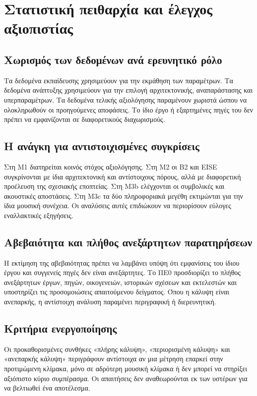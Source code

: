\documentclass[11pt,a4paper]{extarticle}
\begin{document}
\section{Στατιστική πειθαρχία και έλεγχος αξιοπιστίας}
\subsection*{Χωρισμός των δεδομένων ανά ερευνητικό ρόλο}
Τα δεδομένα εκπαίδευσης χρησιμεύουν για την εκμάθηση των παραμέτρων. Τα δεδομένα ανάπτυξης χρησιμεύουν για την επιλογή αρχιτεκτονικής, αναπαράστασης και υπερπαραμέτρων. Τα δεδομένα τελικής αξιολόγησης παραμένουν χωριστά ώσπου να ολοκληρωθούν οι προηγούμενες αποφάσεις. Το ίδιο έργο ή εξαρτημένες πηγές του δεν πρέπει να εμφανίζονται σε διαφορετικούς διαχωρισμούς.

\subsection*{Η ανάγκη για αντιστοιχισμένες συγκρίσεις}
Στη M1 διατηρείται κοινός στόχος αξιολόγησης. Στη M2 οι B2 και EISE συγκρίνονται με ίδια αρχιτεκτονική και αντίστοιχους πόρους, αλλά με διαφορετική προέλευση της σχεσιακής εποπτείας. Στη M3b ελέγχονται οι συμβολικές και ακουστικές αποστάσεις. Στη M3c τα δύο πληροφοριακά μεγέθη εκτιμώνται για την ίδια μουσική συνέχεια. Οι αναλύσεις αυτές επιδιώκουν να περιορίσουν εύλογες εναλλακτικές εξηγήσεις.

\subsection*{Αβεβαιότητα και πλήθος ανεξάρτητων παρατηρήσεων}
Η εκτίμηση της αβεβαιότητας πρέπει να λαμβάνει υπόψη ότι εμφανίσεις του ίδιου έργου και συγγενείς πηγές δεν είναι ανεξάρτητες. Το ΠΕ0 προσδιορίζει το πλήθος ανεξάρτητων έργων, πηγών, οικογενειών, ιστορικών σχέσεων και εκτελεστών και υποστηρίζει τις προσομοιώσεις απαιτούμενου δείγματος. Όπου η κάλυψη είναι ανεπαρκής, η αντίστοιχη ανάλυση παραμένει περιγραφική ή διερευνητική.

\subsection*{Κριτήρια ενεργοποίησης}
Οι προκαθορισμένες συνθήκες «πλήρης κάλυψη», «περιορισμένη κάλυψη» και «ανεπαρκής κάλυψη» περιγράφουν αντίστοιχα αν μια μέτρηση επαρκεί στην προτιμώμενη κλίμακα, μόνο σε αδρότερη μουσική κλίμακα ή δεν μπορεί να στηρίξει αξιόπιστο κύριο συμπέρασμα. Οι απαιτήσεις δεν αναθεωρούνται εκ των υστέρων για να βελτιωθεί ένα αποτέλεσμα.
\end{document}
